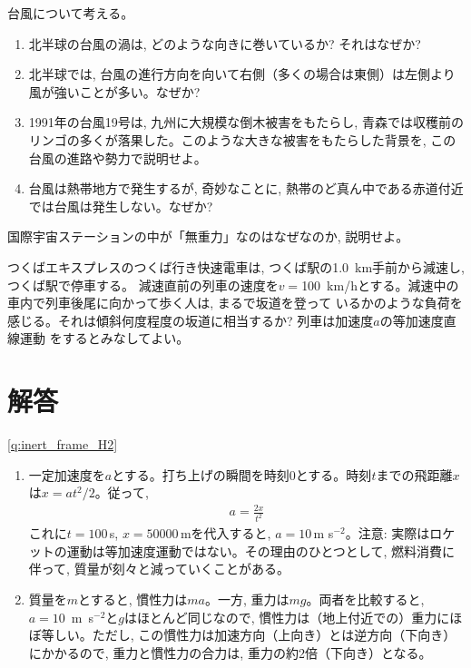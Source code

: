 \begin{q}\label{q:typhoon} 台風について考える。
\begin{enumerate}
\item 北半球の台風の渦は, どのような向きに巻いているか? それはなぜか?
\item 北半球では, 台風の進行方向を向いて右側（多くの場合は東側）は左側より風が強いことが多い。なぜか?
\item 1991年の台風19号は, 九州に大規模な倒木被害をもたらし, 青森では収穫前のリンゴの多くが落果した。このような大きな被害をもたらした背景を, この台風の進路や勢力で説明せよ。
\item 台風は熱帯地方で発生するが, 奇妙なことに, 熱帯のど真ん中である赤道付近では台風は発生しない。なぜか?
\end{enumerate}
\end{q}\mv

\begin{exq} 国際宇宙ステーションの中が「無重力」なのはなぜなのか, 説明せよ。\end{exq}\mv

\begin{exq} つくばエキスプレスのつくば行き快速電車は, つくば駅の1.0~km手前から減速し, つくば駅で停車する。
減速直前の列車の速度を$v=$100~km/hとする。減速中の車内で列車後尾に向かって歩く人は, まるで坂道を登って
いるかのような負荷を感じる。それは傾斜何度程度の坂道に相当するか? 列車は加速度$a$の等加速度直線運動
をするとみなしてよい。\end{exq}

\hv


\section{解答}

\ref{q:inert_frame_H2}
\begin{enumerate}
\item 一定加速度を$a$とする。打ち上げの瞬間を時刻0とする。時刻$t$までの飛距離$x$は$x=at^2/2$。従って, 
\begin{eqnarray*}
a=\frac{2x}{t^2}
\end{eqnarray*}
これに$t=100\,$s, $x=50000\,$mを代入すると, $a=10\,$m s$^{-2}$。注意: 実際はロケットの運動は等加速度運動ではない。その理由のひとつとして, 燃料消費に伴って, 質量が刻々と減っていくことがある。
\item 質量を$m$とすると, 慣性力は$ma$。一方, 重力は$mg$。両者を比較すると, $a=10$~m~s$^{-2}$と$g$はほとんど同じなので, 慣性力は（地上付近での）重力にほぼ等しい。ただし, この慣性力は加速方向（上向き）とは逆方向（下向き）にかかるので, 重力と慣性力の合力は, 重力の約2倍（下向き）となる。
\end{enumerate}
\vspace{0.2cm}

